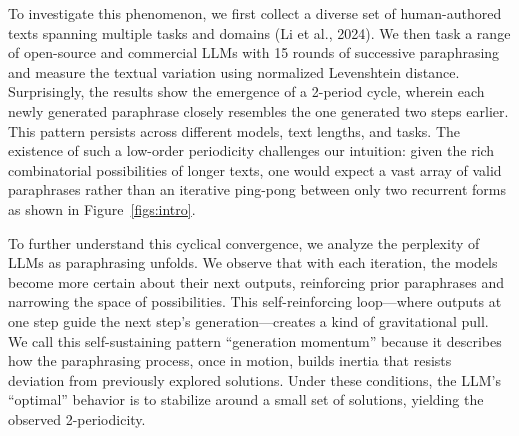 



To investigate this phenomenon, we first collect a diverse set of human-authored texts spanning multiple tasks and domains (Li et al., 2024). 
We then task a range of open-source and commercial LLMs with 15 rounds of successive paraphrasing and measure the textual variation using normalized Levenshtein distance. 
Surprisingly, the results show the emergence of a 2-period cycle, wherein each newly generated paraphrase closely resembles the one generated two steps earlier. This pattern persists across different models, text lengths, and tasks. The existence of such a low-order periodicity challenges our intuition: given the rich combinatorial possibilities of longer texts, one would expect a vast array of valid paraphrases rather than an iterative ping-pong between only two recurrent forms as shown in Figure~\ref{figs:intro}.


To further understand this cyclical convergence, we analyze the perplexity of LLMs as paraphrasing unfolds. We observe that with each iteration, the models become more certain about their next outputs, reinforcing prior paraphrases and narrowing the space of possibilities. This self-reinforcing loop—where outputs at one step guide the next step’s generation—creates a kind of gravitational pull. We call this self-sustaining pattern “generation momentum” because it describes how the paraphrasing process, once in motion, builds inertia that resists deviation from previously explored solutions. Under these conditions, the LLM’s “optimal” behavior is to stabilize around a small set of solutions, yielding the observed 2-periodicity.

